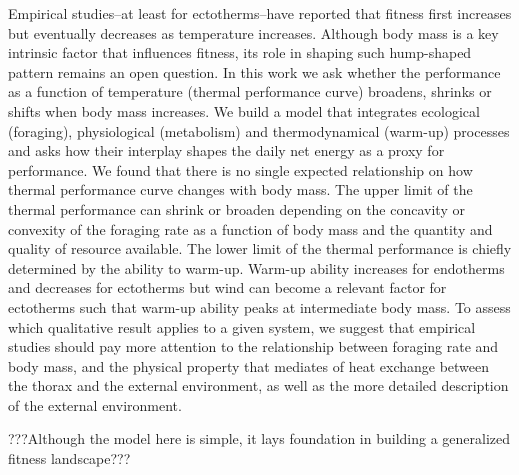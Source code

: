 Empirical studies--at least for ectotherms--have reported that fitness first increases but eventually decreases as temperature increases.
Although body mass is a key intrinsic factor that influences fitness, its role in shaping such hump-shaped pattern remains an open question.
In this work we ask whether the performance as a function of temperature (thermal performance curve) broadens, shrinks or shifts when body mass increases.
We build a model that integrates ecological (foraging), physiological (metabolism) and thermodynamical (warm-up) processes and asks how their interplay shapes the daily net energy as a proxy for performance.
We found that there is no single expected relationship on how thermal performance curve changes with body mass.
The upper limit of the thermal performance can shrink or broaden depending on the concavity or convexity of the foraging rate as a function of body mass and the quantity and quality of resource available.
The lower limit of the thermal performance is chiefly determined by the ability to warm-up.
Warm-up ability increases for endotherms and decreases for ectotherms but wind can become a relevant factor for ectotherms such that warm-up ability peaks at intermediate body mass.
To assess which qualitative result applies to a given system, we suggest that empirical studies should pay more attention to the relationship between foraging rate and body mass, and the physical property that mediates of heat exchange between the thorax and the external environment, as well as the more detailed description of the external environment.

???Although the model here is simple, it lays foundation in building a generalized fitness landscape???
